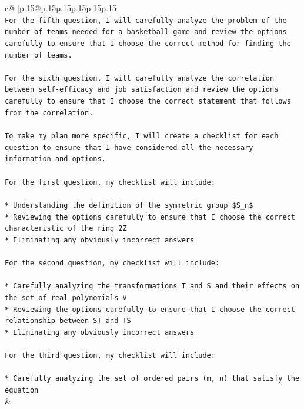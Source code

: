 \documentclass{article}
\begin{document}
{\begin{supertabular}{c@{$\;$}|p{.15\linewidth}@{}p{.15\linewidth}p{.15\linewidth}p{.15\linewidth}p{.15\linewidth}p{.15\linewidth}}
{{{\\ 
\texttt{For the fifth question, I will carefully analyze the problem of the number of teams needed for a basketball game and review the options carefully to ensure that I choose the correct method for finding the number of teams.} \\
\\ 
\texttt{For the sixth question, I will carefully analyze the correlation between self{-}efficacy and job satisfaction and review the options carefully to ensure that I choose the correct statement that follows from the correlation.} \\
\\ 
\texttt{To make my plan more specific, I will create a checklist for each question to ensure that I have considered all the necessary information and options.} \\
\\ 
\texttt{For the first question, my checklist will include:} \\
\\ 
\texttt{* Understanding the definition of the symmetric group \$S\_n\$} \\
\texttt{* Reviewing the options carefully to ensure that I choose the correct characteristic of the ring 2Z} \\
\texttt{* Eliminating any obviously incorrect answers} \\
\\ 
\texttt{For the second question, my checklist will include:} \\
\\ 
\texttt{* Carefully analyzing the transformations T and S and their effects on the set of real polynomials V} \\
\texttt{* Reviewing the options carefully to ensure that I choose the correct relationship between ST and TS} \\
\texttt{* Eliminating any obviously incorrect answers} \\
\\ 
\texttt{For the third question, my checklist will include:} \\
\\ 
\texttt{* Carefully analyzing the set of ordered pairs (m, n) that satisfy the equation} \\
            }
        }
    }
    & \\ \\

\end{supertabular}
}
\end{document}
